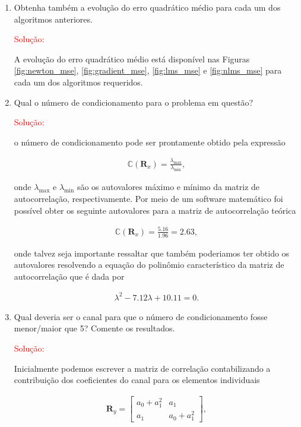\documentclass[a4paper,10pt]{article}
\begin{document}
\begin{enumerate}
\begin{enumerate}
					\item Obtenha também a evolução do erro quadrático médio para cada um dos algoritmos anteriores.
						
						\textcolor{red}{Solução:}

						A evolução do erro quadrático médio está disponível nas Figuras \ref{fig:newton_mse}, \ref{fig:gradient_mse}, \ref{fig:lms_mse} e \ref{fig:nlms_mse} para cada um dos algoritmos requeridos.
					
					\item Qual o número de condicionamento para o problema em questão?
					
						\textcolor{red}{Solução:}
						
						o número de condicionamento pode ser prontamente obtido pela expressão

						\begin{align}
							\mathbb{C} (\mathbf{R}_{x}) = \frac{\lambda_{\text{max}}}{\lambda_{\text{min}}},
						\end{align}
					
						onde $\lambda_{\text{max}}$ e $\lambda_{\text{min}}$ são os autovalores máximo e mínimo da matriz de autocorrelação, respectivamente. Por meio de um software
						matemático foi possível obter os seguinte autovalores para a matriz de autocorrelação teórica

						\begin{align}
							\mathbb{C} (\mathbf{R}_{x}) = \frac{5.16}{1.96} = 2.63,
						\end{align}

						onde talvez seja importante ressaltar que também poderiamos ter obtido os autovalores resolvendo a equação do polinômio
						característico da matriz de autocorrelação que é dada por

						\begin{align}
							\lambda^{2} - 7.12 \lambda + 10.11 = 0. 
						\end{align}

					\item Qual deveria ser o canal para que o número de condicionamento fosse menor/maior que 5?
					Comente os resultados.
					
						\textcolor{red}{Solução:}
						
						Inicialmente podemos escrever a matriz de correlação contabilizando a contribuição dos coeficientes do canal para os elementos individuais
						
						\begin{align}
							\mathbf{R}_{y} =
							\begin{bmatrix}
								a_{0} + a^{2}_{1} & a_{1}\\
								a_{1} & a_{0} + a^{2}_{1}
							\end{bmatrix},
						\end{align}


\end{enumerate}
\end{enumerate}
\end{document}
